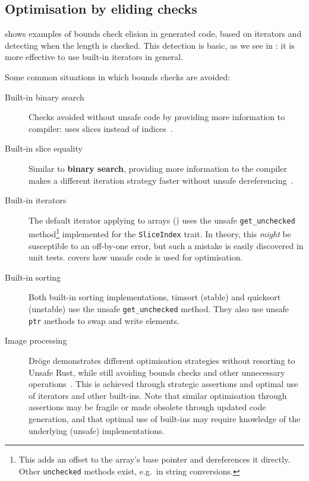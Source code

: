 \documentclass[dissertation.tex]{subfiles}
\begin{document}
\subsection{Optimisation by eliding checks}
 shows examples of bounds check elision in
generated code, based on iterators and detecting when the length is
checked.
This detection is basic, as we see in : it
is more effective to use built-in iterators in general.

Some common situations in which bounds checks are avoided:

\begin{description}
    \item[Built-in binary search] Checks avoided without unsafe code by
    providing more information to compiler: uses slices instead of
    indices~\cite{rust-pr-binarysearch}.
    \item[Built-in slice equality] Similar to \textbf{binary search},
    providing more information to the compiler makes a different
    iteration strategy faster without unsafe dereferencing~\cite{rust-pr-slice-partialeq}.
    \item[Built-in iterators] The default iterator applying to arrays
    () uses the unsafe
    \texttt{get\_unchecked} method\footnote{
    This adds an offset to the array's base pointer and dereferences it
    directly.
    Other \texttt{unchecked} methods exist, e.g.\ in string
    conversions.
    } implemented for the \texttt{SliceIndex} trait.
    In theory, this \emph{might} be susceptible to an off-by-one error,
    but such a mistake is easily discovered in unit tests.
     covers how unsafe code is used for
    optimisation.
    \item[Built-in sorting] Both built-in sorting implementations,
    timsort (stable) and quicksort (unstable) use the unsafe
    \texttt{get\_unchecked} method.
    They also use unsafe \texttt{ptr} methods to swap and write
    elements.
    \item[Image processing] Dr\"oge demonstrates different optimisation
    strategies without resorting to Unsafe Rust, while still avoiding
    bounds checks and other unnecessary operations~\cite{droge-opt}.
    This is achieved through strategic assertions and optimal use of
    iterators and other built-ins.
    Note that similar optimisation through assertions may be fragile or
    made obsolete through updated code generation, and that optimal use
    of built-ins may require knowledge of the underlying (unsafe)
    implementations.
\end{description}
\end{document}
